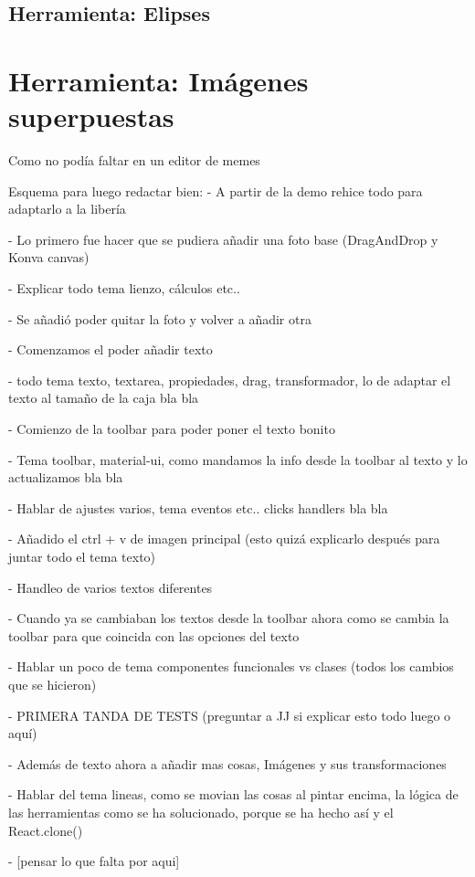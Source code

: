   \subsection{Herramienta: Elipses}
\section{Herramienta: Imágenes superpuestas}
Como no podía faltar en un editor de memes


\iffalse
Esquema para luego redactar bien:
- A partir de la demo rehice todo para adaptarlo a la libería 

- Lo primero fue hacer que se pudiera añadir una foto base (DragAndDrop y Konva canvas)

- Explicar todo tema lienzo, cálculos etc..

- Se añadió poder quitar la foto y volver a añadir otra

- Comenzamos el poder añadir texto

- todo tema texto, textarea, propiedades, drag, transformador, lo de adaptar el texto al tamaño de la caja bla bla 

- Comienzo de la toolbar para poder poner el texto bonito

- Tema toolbar, material-ui, como mandamos la info desde la toolbar al texto y lo actualizamos bla bla

- Hablar de ajustes varios, tema eventos etc.. clicks handlers bla bla

- Añadido el ctrl + v de imagen principal (esto quizá explicarlo después para juntar todo el tema texto)

- Handleo de varios textos diferentes

- Cuando ya se cambiaban los textos desde la toolbar ahora como se cambia la toolbar para que coincida con las opciones del texto

- Hablar un poco de tema componentes funcionales vs clases (todos los cambios que se hicieron)

- PRIMERA TANDA DE TESTS (preguntar a JJ si explicar esto todo luego o aquí)

- Además de texto ahora a añadir mas cosas, Imágenes y sus transformaciones

- Hablar del tema lineas, como se movian las cosas al pintar encima, la lógica de las herramientas
  como se ha solucionado, porque se ha hecho así y el React.clone()

- [pensar lo que falta por aqui]


